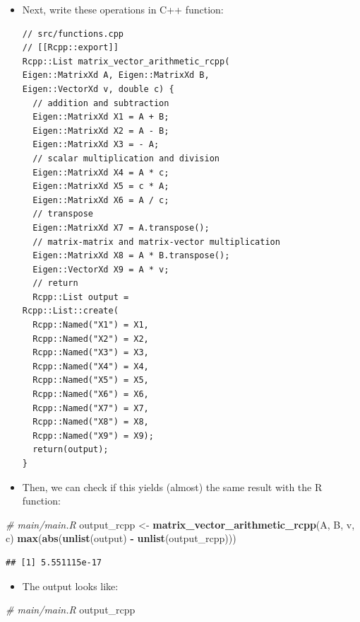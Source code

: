 \documentclass[]{book}
\newenvironment{Shaded}{\begin{snugshade}}{\end{snugshade}}
\newcommand{\KeywordTok}[1]{\textcolor[rgb]{0.13,0.29,0.53}{\textbf{#1}}}
\newcommand{\StringTok}[1]{\textcolor[rgb]{0.31,0.60,0.02}{#1}}
\newcommand{\CommentTok}[1]{\textcolor[rgb]{0.56,0.35,0.01}{\textit{#1}}}
\newcommand{\OperatorTok}[1]{\textcolor[rgb]{0.81,0.36,0.00}{\textbf{#1}}}
\newcommand{\NormalTok}[1]{#1}
\providecommand{\tightlist}{%
  \setlength{\itemsep}{0pt}\setlength{\parskip}{0pt}}
\begin{document}
\begin{itemize}
\item
  Next, write these operations in C++ function:

\begin{verbatim}
// src/functions.cpp
// [[Rcpp::export]]
Rcpp::List matrix_vector_arithmetic_rcpp(
Eigen::MatrixXd A, Eigen::MatrixXd B, 
Eigen::VectorXd v, double c) {
  // addition and subtraction
  Eigen::MatrixXd X1 = A + B;
  Eigen::MatrixXd X2 = A - B;
  Eigen::MatrixXd X3 = - A;
  // scalar multiplication and division
  Eigen::MatrixXd X4 = A * c;
  Eigen::MatrixXd X5 = c * A;
  Eigen::MatrixXd X6 = A / c;
  // transpose
  Eigen::MatrixXd X7 = A.transpose();
  // matrix-matrix and matrix-vector multiplication
  Eigen::MatrixXd X8 = A * B.transpose();
  Eigen::VectorXd X9 = A * v;
  // return 
  Rcpp::List output = 
Rcpp::List::create(
  Rcpp::Named("X1") = X1,
  Rcpp::Named("X2") = X2,
  Rcpp::Named("X3") = X3,
  Rcpp::Named("X4") = X4,
  Rcpp::Named("X5") = X5,
  Rcpp::Named("X6") = X6,
  Rcpp::Named("X7") = X7,
  Rcpp::Named("X8") = X8,
  Rcpp::Named("X9") = X9);
  return(output);
}
\end{verbatim}
\item
  Then, we can check if this yields (almost) the same result with the R
  function:
\end{itemize}

\begin{Shaded}
\begin{Highlighting}[]
\CommentTok{# main/main.R}
\NormalTok{output_rcpp <-}\StringTok{ }\KeywordTok{matrix_vector_arithmetic_rcpp}\NormalTok{(A, B, v, c)}
\KeywordTok{max}\NormalTok{(}\KeywordTok{abs}\NormalTok{(}\KeywordTok{unlist}\NormalTok{(output) }\OperatorTok{-}\StringTok{ }\KeywordTok{unlist}\NormalTok{(output_rcpp)))}
\end{Highlighting}
\end{Shaded}

\begin{verbatim}
## [1] 5.551115e-17
\end{verbatim}

\begin{itemize}
\tightlist
\item
  The output looks like:
\end{itemize}

\begin{Shaded}
\begin{Highlighting}[]
\CommentTok{# main/main.R}
\NormalTok{output_rcpp}
\end{Highlighting}
\end{Shaded}
\end{document}
